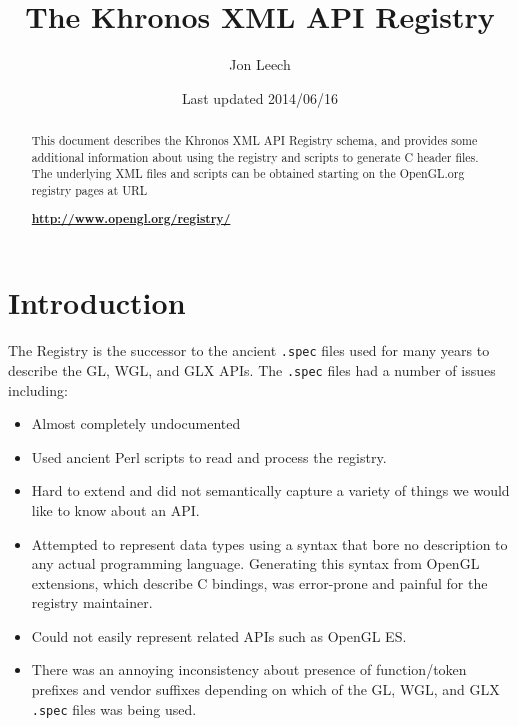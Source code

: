 \documentclass{article}
\def\code#1{{\tt #1}}
\begin{document}
\title{The Khronos XML API Registry}
\author{Jon Leech}
\date{Last updated 2014/06/16}
\maketitle

\begin{abstract}

This document describes the Khronos XML API Registry schema, and
provides some additional information about using the registry and
scripts to generate C header files. The underlying XML files and scripts
can be obtained starting on the OpenGL.org registry pages at URL

\begin{center}
{\bf \href{http://www.opengl.org/registry/}
	  {http://www.opengl.org/registry/}}
\end{center}

\end{abstract}

\tableofcontents

\section{Introduction}

The Registry is the successor to the ancient \code{.spec} files used for
many years to describe the GL, WGL, and GLX APIs. The \code{.spec} files
had a number of issues including:

\begin{itemize}
\item Almost completely undocumented
\item Used ancient Perl scripts to read and process the registry.
\item Hard to extend and did not semantically capture a variety of
      things we would like to know about an API.
\item Attempted to represent data types using a syntax that bore no
      description to any actual programming language. Generating this
      syntax from OpenGL extensions, which describe C bindings, was
      error-prone and painful for the registry maintainer.
\item Could not easily represent related APIs such as OpenGL ES.
\item There was an annoying inconsistency about presence of
      function/token prefixes and vendor suffixes depending on which of
      the GL, WGL, and GLX \code{.spec} files was being used.
\end{itemize}
\end{document}
